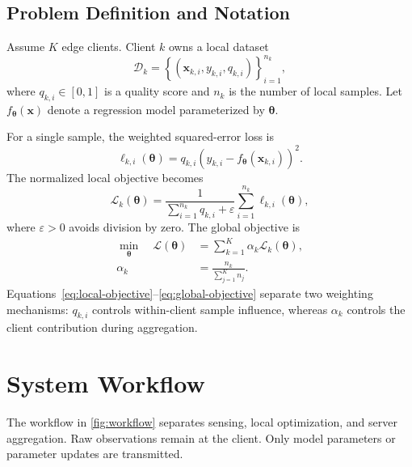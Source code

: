 \documentclass[10pt]{article}
\newcommand{\loss}{\mathcal{L}}
\newcommand{\dataset}{\mathcal{D}}
\begin{document}
\subsection{Problem Definition and Notation}

Assume $K$ edge clients. Client $k$ owns a local dataset
\begin{equation}
\dataset_k = \left\{\left(\mathbf{x}_{k,i},y_{k,i},q_{k,i}\right)\right\}_{i=1}^{n_k},
\label{eq:dataset}
\end{equation}
where $q_{k,i}\in[0,1]$ is a quality score and $n_k$ is the number of local samples. Let $f_{\boldsymbol{\theta}}(\mathbf{x})$ denote a regression model parameterized by $\boldsymbol{\theta}$.

For a single sample, the weighted squared-error loss is
\begin{equation}
\ell_{k,i}(\boldsymbol{\theta})
= q_{k,i}\left(y_{k,i}-f_{\boldsymbol{\theta}}(\mathbf{x}_{k,i})\right)^2.
\label{eq:sample-loss}
\end{equation}
The normalized local objective becomes
\begin{equation}
\loss_k(\boldsymbol{\theta})
= \frac{1}{\sum_{i=1}^{n_k}q_{k,i}+\varepsilon}
\sum_{i=1}^{n_k}\ell_{k,i}(\boldsymbol{\theta}),
\label{eq:local-objective}
\end{equation}
where $\varepsilon>0$ avoids division by zero. The global objective is
\begin{align}
\min_{\boldsymbol{\theta}}\quad
\loss(\boldsymbol{\theta})
&= \sum_{k=1}^{K}\alpha_k\loss_k(\boldsymbol{\theta}), \\
\alpha_k
&= \frac{n_k}{\sum_{j=1}^{K} n_j}.
\label{eq:global-objective}
\end{align}
Equations~\eqref{eq:local-objective}--\eqref{eq:global-objective} separate two weighting mechanisms: $q_{k,i}$ controls within-client sample influence, whereas $\alpha_k$ controls the client contribution during aggregation.

\section{System Workflow}

The workflow in \cref{fig:workflow} separates sensing, local optimization, and server aggregation. Raw observations remain at the client. Only model parameters or parameter updates are transmitted.
\end{document}
